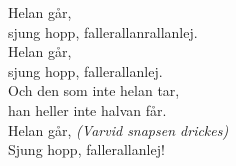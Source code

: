 \vspace{10pt}
Helan går,\\
sjung hopp, fallerallanrallanlej.\\
Helan går,\\
sjung hopp, fallerallanlej.\\
Och den som inte helan tar,\\
han heller inte halvan får.\\
Helan går, \textit{(Varvid snapsen drickes)}\\
Sjung hopp, fallerallanlej!
